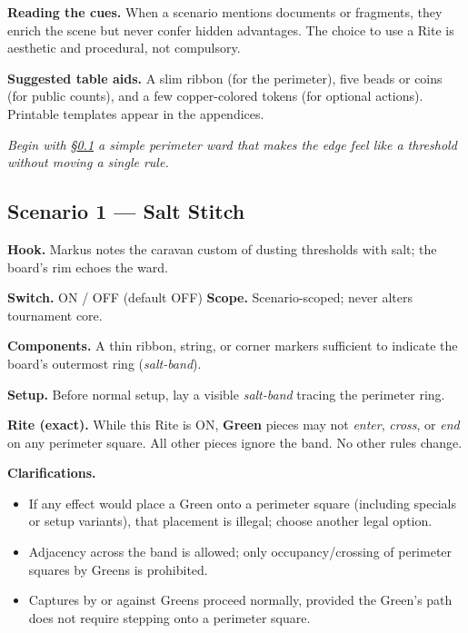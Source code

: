 \documentclass[11pt]{article}
\numberwithin{equation}{section} %
\theoremstyle{plain} %
\theoremstyle{definition} %
\theoremstyle{remark} %
\begin{document}
\medskip
\noindent\textbf{Reading the cues.} When a scenario mentions documents or fragments, they enrich the scene but never confer hidden advantages. The choice to use a Rite is aesthetic and procedural, not compulsory.

\medskip
\noindent\textbf{Suggested table aids.} A slim ribbon (for the perimeter), five beads or coins (for public counts), and a few copper-colored tokens (for optional actions). Printable templates appear in the appendices.

\medskip
\noindent\textit{Begin with \S\ref{scen:salt-stitch} \textemdash{} a simple perimeter ward that makes the edge feel like a threshold without moving a single rule.}

\subsection{Scenario 1 — Salt Stitch}
\label{scen:salt-stitch}

\noindent\textbf{Hook.} Markus notes the caravan custom of dusting thresholds with salt; the board’s rim echoes the ward.

\medskip
\noindent\textbf{Switch.} \textsc{ON / OFF} (default \textsc{OFF}) \hfill \textbf{Scope.} Scenario-scoped; never alters tournament core.

\medskip
\noindent\textbf{Components.} A thin ribbon, string, or corner markers sufficient to indicate the board’s outermost ring (\emph{salt-band}).

\medskip
\noindent\textbf{Setup.} Before normal setup, lay a visible \emph{salt-band} tracing the perimeter ring.

\medskip
\noindent\textbf{Rite (exact).} While this Rite is \textsc{ON}, \textbf{Green} pieces may not \emph{enter}, \emph{cross}, or \emph{end} on any perimeter square. All other pieces ignore the band. No other rules change.

\medskip
\noindent\textbf{Clarifications.}
\begin{itemize}\setlength\itemsep{0.25em}
  \item If any effect would place a Green onto a perimeter square (including specials or setup variants), that placement is illegal; choose another legal option.
  \item Adjacency across the band is allowed; only occupancy/crossing of perimeter squares by Greens is prohibited.
  \item Captures by or against Greens proceed normally, provided the Green’s path does not require stepping onto a perimeter square.
\end{itemize}
\end{document}
